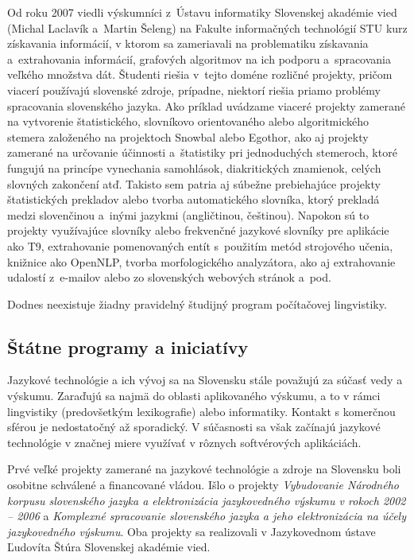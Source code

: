 \begin{multicols}{2}
Od roku 2007 viedli výskumníci z~Ústavu informatiky Slovenskej akadémie vied (Michal Laclavík a~Martin Šeleng) na Fakulte informačných technológií STU kurz získavania informácií, v ktorom sa zameriavali na problematiku získavania a~extrahovania informácií\cite{f30}, grafových algoritmov na ich podporu a~spracovania veľkého množstva dát. Študenti riešia v~tejto doméne rozličné projekty, pričom viacerí používajú slovenské zdroje, prípadne, niektorí riešia priamo problémy spracovania slovenského jazyka. Ako príklad uvádzame viaceré projekty zamerané na vytvorenie štatistického, slovníkovo orientovaného alebo algoritmického stemera založeného na projektoch Snowbal alebo Egothor, ako aj projekty zamerané na určovanie účinnosti a~štatistiky pri jednoduchých stemeroch, ktoré fungujú na princípe vynechania samohlások, diakritických znamienok, celých slovných zakončení atď. Takisto sem patria aj súbežne prebiehajúce projekty štatistických prekladov alebo tvorba automatického slovníka, ktorý prekladá medzi slovenčinou a~inými jazykmi (angličtinou, češtinou). Napokon sú to projekty využívajúce slovníky alebo frekvenčné jazykové slovníky pre aplikácie ako T9, extrahovanie pomenovaných entít s~použitím metód strojového učenia, knižnice ako OpenNLP, tvorba morfologického analyzátora, ako aj extrahovanie udalostí z~e-mailov alebo zo slovenských webových stránok a~pod.

Dodnes neexistuje žiadny pravidelný študijný program počítačovej lingvistiky.

\subsection{Štátne programy a iniciatívy}
Jazykové technológie a ich vývoj sa na Slovensku stále považujú za súčasť vedy a výskumu. Zaraďujú sa najmä do oblasti aplikovaného výskumu, a to v rámci lingvistiky (predovšetkým lexikografie) alebo informatiky. Kontakt s komerčnou sférou je nedostatočný až sporadický. V súčasnosti sa však začínajú jazykové technológie v značnej miere využívať v rôznych softvérových aplikáciách.

Prvé veľké projekty zamerané na jazykové technológie a zdroje na Slovensku boli osobitne schválené a financované vládou. Išlo o projekty {\em Vybudovanie Národného korpusu slovenského jazyka a elektronizácia jazykovedného výskumu v rokoch 2002 -- 2006} a {\em Komplexné spracovanie slovenského jazyka a jeho elektronizácia na účely jazykovedného výskumu}. Oba projekty sa realizovali v Jazykovednom ústave Ľudovíta Štúra Slovenskej akadémie vied.


\end{multicols}
